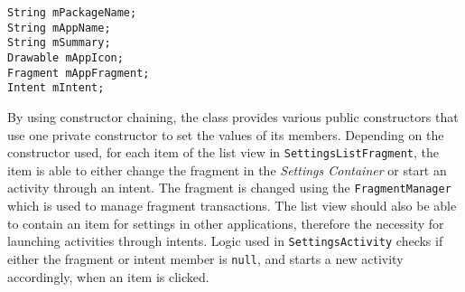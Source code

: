 \begin{lstlisting}[caption={Members of the \lstinline|SettingsListItem| class.}, label={lst:settingslistitem}]
String mPackageName;
String mAppName;
String mSummary;
Drawable mAppIcon;
Fragment mAppFragment;
Intent mIntent;
\end{lstlisting}

By using constructor chaining, the class provides various public constructors that use one private constructor to set the values of its members.
Depending on the constructor used, for each item of the list view in \lstinline|SettingsListFragment|, the item is able to either change the fragment in the \textit{Settings Container} or start an activity through an intent.
The fragment is changed using the \lstinline|FragmentManager| which is used to manage fragment transactions.
The list view should also be able to contain an item for settings in other \giraf applications, therefore the necessity for launching activities through intents.
Logic used in \lstinline|SettingsActivity| checks if either the fragment or intent member is \lstinline|null|, and starts a new activity accordingly, when an item is clicked.
